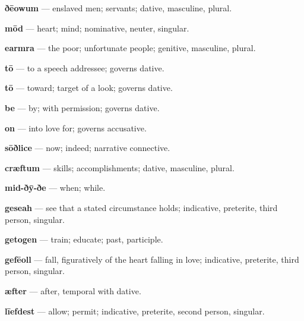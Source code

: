 \textbf{ðēowum} — enslaved men; servants; dative, masculine, plural.

\textbf{mōd} — heart; mind; nominative, neuter, singular.

\textbf{earmra} — the poor; unfortunate people; genitive, masculine, plural.

\textbf{tō} — to a speech addressee; governs dative.

\textbf{tō} — toward; target of a look; governs dative.

\textbf{be} — by; with permission; governs dative.

\textbf{on} — into love for; governs accusative.

\textbf{sōðlice} — now; indeed; narrative connective.

\textbf{cræftum} — skills; accomplishments; dative, masculine, plural.

\textbf{mid-ðȳ-ðe} — when; while.

\textbf{geseah} — see that a stated circumstance holds; indicative, preterite, third person, singular.

\textbf{getogen} — train; educate; past, participle.

\textbf{gefēoll} — fall, figuratively of the heart falling in love; indicative, preterite, third person, singular.

\textbf{æfter} — after, temporal with dative.

\textbf{līefdest} — allow; permit; indicative, preterite, second person, singular.

